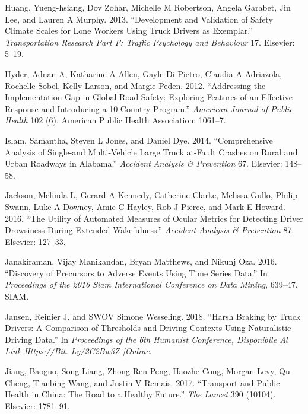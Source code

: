 \documentclass[12pt]{book}
\numberwithin{equation}{chapter}
\begin{document}
\leavevmode\hypertarget{ref-huang2013development}{}%
Huang, Yueng-hsiang, Dov Zohar, Michelle M Robertson, Angela Garabet, Jin Lee, and Lauren A Murphy. 2013. ``Development and Validation of Safety Climate Scales for Lone Workers Using Truck Drivers as Exemplar.'' \emph{Transportation Research Part F: Traffic Psychology and Behaviour} 17. Elsevier: 5--19.

\leavevmode\hypertarget{ref-hyder2012addressing}{}%
Hyder, Adnan A, Katharine A Allen, Gayle Di Pietro, Claudia A Adriazola, Rochelle Sobel, Kelly Larson, and Margie Peden. 2012. ``Addressing the Implementation Gap in Global Road Safety: Exploring Features of an Effective Response and Introducing a 10-Country Program.'' \emph{American Journal of Public Health} 102 (6). American Public Health Association: 1061--7.

\leavevmode\hypertarget{ref-islam2014comprehensive}{}%
Islam, Samantha, Steven L Jones, and Daniel Dye. 2014. ``Comprehensive Analysis of Single-and Multi-Vehicle Large Truck at-Fault Crashes on Rural and Urban Roadways in Alabama.'' \emph{Accident Analysis \& Prevention} 67. Elsevier: 148--58.

\leavevmode\hypertarget{ref-jackson2016utility}{}%
Jackson, Melinda L, Gerard A Kennedy, Catherine Clarke, Melissa Gullo, Philip Swann, Luke A Downey, Amie C Hayley, Rob J Pierce, and Mark E Howard. 2016. ``The Utility of Automated Measures of Ocular Metrics for Detecting Driver Drowsiness During Extended Wakefulness.'' \emph{Accident Analysis \& Prevention} 87. Elsevier: 127--33.

\leavevmode\hypertarget{ref-janakiraman2016discovery}{}%
Janakiraman, Vijay Manikandan, Bryan Matthews, and Nikunj Oza. 2016. ``Discovery of Precursors to Adverse Events Using Time Series Data.'' In \emph{Proceedings of the 2016 Siam International Conference on Data Mining}, 639--47. SIAM.

\leavevmode\hypertarget{ref-jansen2018harsh}{}%
Jansen, Reinier J, and SWOV Simone Wesseling. 2018. ``Harsh Braking by Truck Drivers: A Comparison of Thresholds and Driving Contexts Using Naturalistic Driving Data.'' In \emph{Proceedings of the 6th Humanist Conference, Disponibile Al Link Https://Bit. Ly/2C2Bw3Z {[}Online}.

\leavevmode\hypertarget{ref-jiang2017transport}{}%
Jiang, Baoguo, Song Liang, Zhong-Ren Peng, Haozhe Cong, Morgan Levy, Qu Cheng, Tianbing Wang, and Justin V Remais. 2017. ``Transport and Public Health in China: The Road to a Healthy Future.'' \emph{The Lancet} 390 (10104). Elsevier: 1781--91.
\end{document}
